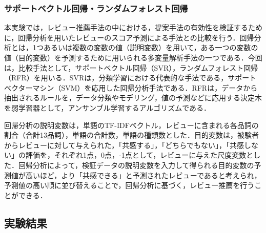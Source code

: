 \documentclass[a4paper,11pt,oneside,openany]{jsbook}
\begin{document}
\subsubsection{サポートベクトル回帰・ランダムフォレスト回帰}
本実験では，レビュー推薦手法の中における，提案手法の有効性を検証するために，回帰分析を用いたレビューのスコア予測による手法との比較を行う．回帰分析とは，1つあるいは複数の変数の値（説明変数）を用いて，ある一つの変数の値（目的変数）を予測するために用いられる多変量解析手法の一つである．今回は，比較手法として，サポートベクトル回帰（SVR），ランダムフォレスト回帰（RFR）を用いる．SVRは，分類学習における代表的な手法である，サポートベクターマシン（SVM）を応用した回帰分析手法である．RFRは，データから抽出されるルールを，データ分類やモデリング，値の予測などに応用する決定木を弱学習器として，アンサンブル学習するアルゴリズムである．
\par
回帰分析の説明変数は，単語のTF-IDFベクトル，レビューに含まれる各品詞の割合（合計13品詞），単語の合計数，単語の種類数とした．目的変数は，被験者からレビューに対して与えられた，「共感する」，「どちらでもない」，「共感しない」の評価を，それぞれ1点，0点，-1点として，レビューに与えた尺度変数とした．回帰分析によって，検証データの説明変数を入力して得られる目的変数の予測値が高いほど，より「共感できる」と予測されたレビューであると考えられ，予測値の高い順に並び替えることで，回帰分析に基づく，レビュー推薦を行うことができる．

		\subsection{実験結果}
\end{document}
